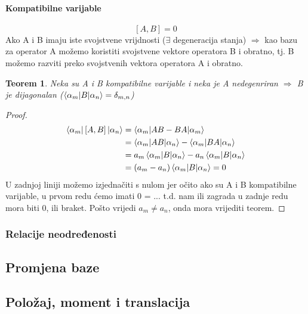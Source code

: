 \documentclass{article}
\newtheorem{theorem}{Teorem}[section]
\newtheorem{proof}{Dokaz}[section]
\numberwithin{equation}{section}
\begin{document}
\paragraph{Kompatibilne varijable} 

\begin{equation}
	\left[A,B\right] = 0
\end{equation}
Ako A i B imaju iste svojstvene vrijdnosti ($\exists$ degeneracija stanja) $\Rightarrow$ kao bazu za operator 
A možemo koristiti svojstvene vektore operatora B i obratno, tj. B možemo razviti preko svojstvenih vektora operatora A i obratno.
\begin{theorem}
	Neka su A i B kompatibilne varijable i neka je A nedegenriran $\Rightarrow$ B je dijagonalan ($\braket{\alpha_m|B|\alpha_n} = \delta_{m,n}$)
\end{theorem}
\begin{proof}
	\begin{equation}
		\begin{aligned}
			\braket{\alpha_m|\left[A,B\right]|\alpha_n} &= \braket{\alpha_m|AB-BA|\alpha_m}\\
																									&=\braket{\alpha_m|AB|\alpha_n} - \braket{\alpha_m|BA|\alpha_n}\\
																									&= a_m \braket{\alpha_m|B|\alpha_n} - a_n\braket{\alpha_m|B|\alpha_n}\\
																									&=\left(a_m - a_n \right) \braket{\alpha_m|B|\alpha_n} = 0
		\end{aligned}
	\end{equation}
	U zadnjoj liniji možemo izjednačiti s nulom jer očito ako su A i B kompatibilne varijable, u prvom redu ćemo imati 0 = ...
	t.d. nam ili zagrada u zadnje redu mora biti 0, ili braket. Pošto vrijedi $a_m \ne a_n$, onda mora vrijediti teorem.
\end{proof}


\subsubsection{Relacije neodređenosti}

\subsection{Promjena baze}

\subsection{Položaj, moment i translacija}
\end{document}

